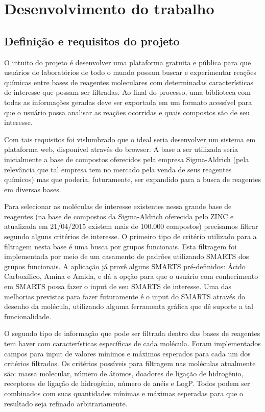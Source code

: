 \documentclass{abnt}
\begin{document}
\chapter{Desenvolvimento do trabalho}

\section{Definição e requisitos do projeto}

O intuito do projeto é desenvolver uma plataforma gratuita e pública para que usuários de laboratórios de todo o mundo possam buscar e experimentar reações químicas entre bases de reagentes moleculares com determinadas características de interesse que possam ser filtradas. Ao final do processo, uma biblioteca com todas as informações geradas deve ser exportada em um formato acessível para que o usuário possa analisar as reações ocorridas e quais compostos são de seu interesse.

Com tais requisitos foi vislumbrado que o ideal seria desenvolver um sistema em plataforma web, disponível através do browser. A base a ser utilizada seria inicialmente a base de compostos oferecidos pela empresa Sigma-Aldrich (pela relevância que tal empresa tem no mercado pela venda de seus reagentes químicos) mas que poderia, futuramente, ser expandido para a busca de reagentes em diversas bases.

Para selecionar as moléculas de interesse existentes nessa grande base de reagentes (na base de compostos da Sigma-Aldrich oferecida pelo ZINC e atualizada em 21/04/2015 existem mais de 100.000 compostos) precisamos filtrar segundo alguns critérios de interesse. O primeiro tipo de critério utilizado para a filtragem nesta base é uma busca por grupos funcionais. Esta filtragem foi implementada por meio de um casamento de padrões utilizando SMARTS dos grupos funcionais. A aplicação já provê alguns SMARTS pré-definidos: Ácido Carboxílico, Amina e Amida, e dá a opção para que o usuário com conhecimento em SMARTS possa fazer o input de seu SMARTS de interesse. Uma das melhorias previstas para fazer futuramente é o input do SMARTS através do desenho da molécula, utilizando alguma ferramenta gráfica que dê suporte a tal funcionalidade.

O segundo tipo de informação que pode ser filtrada dentro das bases de reagentes tem haver com características específicas de cada molécula. Foram implementados campos para input de valores mínimos e máximos esperados para cada um dos critérios filtrados. Os critérios possíveis para filtragem nas moléculas atualmente são: massa molecular, número de átomos, doadores de ligação de hidrogênio, receptores de ligação de hidrogênio, número de anéis e LogP. Todos podem ser combinados com suas quantidades mínimas e máximas esperadas para que o resultado seja refinado arbitrariamente.
\end{document}
